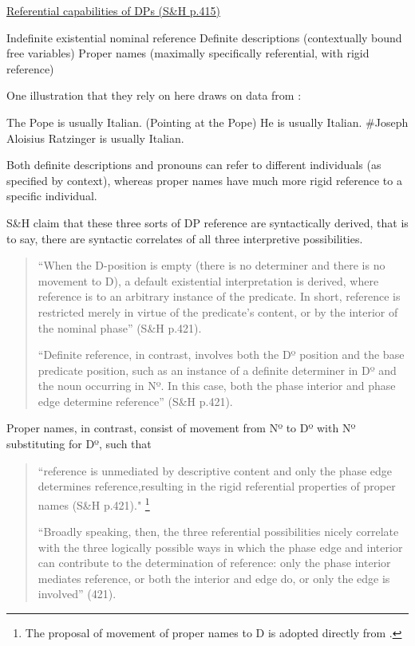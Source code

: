 \ea \underline{Referential capabilities of DPs (S\&H p.415)}

\begin{xlist}
\ex Indefinite existential nominal reference 
\ex Definite descriptions (contextually bound free variables)
\ex Proper names (maximally specifically referential, with rigid reference)

\end{xlist}

\z

One illustration that they rely on here draws on data from \citet{Elbourne:2008}: 

\ea	

\begin{xlist}
\ex The Pope is usually Italian.
\ex (Pointing at the Pope) He is usually Italian.
\ex \#Joseph Aloisius Ratzinger is usually Italian.
\end{xlist}

\z

Both definite descriptions and pronouns can refer to different individuals (as specified by context), whereas proper names have much more rigid reference to a specific individual. 

S\&H claim that these three sorts of DP reference are syntactically derived, that is to say, there are syntactic correlates of all three interpretive possibilities. 

\begin{quote}

``When the D-position is empty (there is no determiner and there is no movement to D), a default existential interpretation is derived, where reference is to an arbitrary instance of the predicate. In short, reference is restricted merely in virtue of the predicate’s content, or by the interior of the nominal phase'' (S\&H p.421).  

``Definite reference, in contrast, involves both the Dº position and the base predicate position, such as an instance of a definite determiner in Dº and the noun occurring in Nº. In this case, both the phase interior and phase edge determine reference” (S\&H p.421). 


\end{quote}

Proper names, in contrast, consist of movement from Nº to Dº with Nº substituting for Dº, such that 

\begin{quote}


``reference is unmediated by descriptive content and only the phase edge determines reference,resulting in the rigid referential properties of proper names (S\&H p.421)." \footnote{The proposal of movement of proper names to D is adopted directly from \citet{Longobardi:1994,Longobardi:2005}.}  

``Broadly speaking, then, the three referential possibilities nicely correlate with the three logically possible ways in which the phase edge and interior can contribute to the determination of reference: only the phase interior mediates reference, or both the interior and edge do, or only the edge is involved'' (421).

\end{quote}



